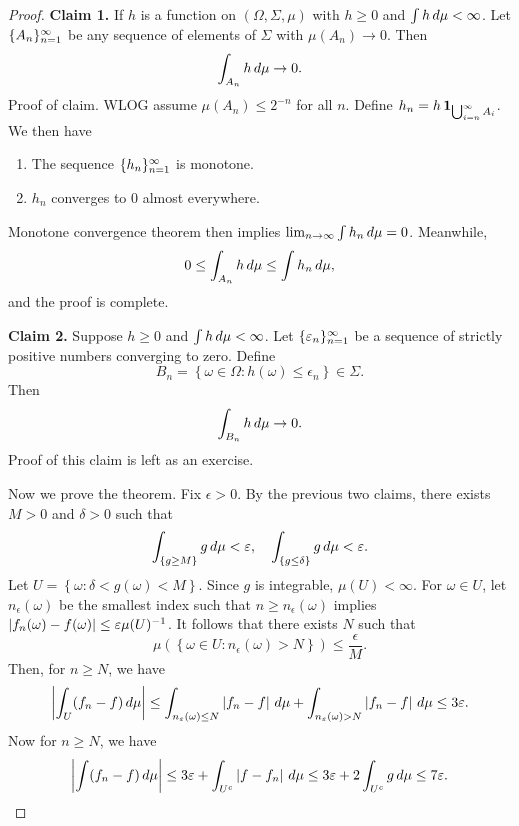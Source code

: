 \documentclass[a4paper]{article}
\begin{document}
\begin{proof}
  \textbf{Claim 1.}
  If $h$ is a function on $(\Omega, \Sigma, \mu)$ with
  $h \geq 0$ and $\int h \, d \mu < \infty$. Let $\{ A_n \}_{n=1}^\infty$
  be any sequence of elements of $\Sigma$ with $\mu (A_n) \to 0$.
  Then
  \[
  \int_{A_n} h \, d \mu \to 0.
  \]
  Proof of claim. WLOG assume $\mu(A_n) \leq 2^{-n}$ for all $n$.
  Define $h_n = h \operatorname{\mathbf{1}}_{\bigcup_{i=n}^\infty A_i}$. We then have
  \begin{enumerate}
    \item The sequence $\{ h_n \}_{n=1}^\infty$ is monotone.
    \item $h_n$ converges to $0$ almost everywhere.
  \end{enumerate}
  Monotone convergence theorem then implies $\lim_{n \to \infty}
  \int h_n \, d \mu = 0$. Meanwhile,
  \[
  0 \leq \int_{A_n} h \, d \mu \leq \int h_n \, d \mu,
  \]
  and the proof is complete.

  \textbf{Claim 2.}
  Suppose $h \geq 0$ and $\int h \, d \mu < \infty$.
  Let $\{ \varepsilon_n \}_{n=1}^\infty$ be a sequence of strictly positive numbers
  converging to zero. Define
  \[
  B_n = \left\{ \omega \in \Omega : h (\omega) \leq \epsilon_n \right\}
  \in \Sigma.
  \]
  Then
  \[
  \int_{B_n} h \, d \mu \to 0.
  \]
  Proof of this claim is left as an exercise.

  Now we prove the theorem. Fix $\epsilon > 0$. By the previous two
  claims, there exists $M > 0$ and $\delta > 0$ such that
  \[
  \int_{\left\{ g \geq M \right\}} g \, d \mu < \varepsilon,
  \quad
  \int_{\left\{ g \leq \delta \right\}} g \, d \mu < \varepsilon.
  \]
  Let $U = \left\{ \omega : \delta < g(\omega) < M \right\}$.
  Since $g$ is integrable, $\mu (U) < \infty$.
  For $\omega \in U$, let $n_\epsilon (\omega)$ be the smallest
  index such that $n \geq n_\epsilon (\omega)$ implies
  $\left\lvert f_n (\omega) - f(\omega)\right\rvert \leq \varepsilon \mu(U)^{-1}$.
  It follows that there exists $N$ such that
  \[
  \mu \left( \left\{ \omega \in U: n_\epsilon (\omega) > N \right\}  \right)
  \leq \frac{\epsilon}{M}.
  \]
  Then, for $n \geq N$, we have
  \begin{align*}
    \left\lvert \int_U (f_n - f) \, d \mu\right\rvert
    \leq \int_{n_\varepsilon (\omega) \leq N} \left\lvert f_n - f\right\rvert \, d \mu
    + \int_{n_\varepsilon (\omega) > N} \left\lvert f_n - f\right\rvert \, d \mu
    \leq 3 \varepsilon.
  \end{align*}
  Now for $n \geq N$, we have
  \[
  \left\lvert \int (f_n - f) \, d \mu\right\rvert
  \leq 3 \varepsilon + \int_{U^c} \left\lvert f - f_n\right\rvert \, d \mu
  \leq 3 \varepsilon + 2 \int_{U^c} g \, d \mu \leq 7 \varepsilon.
  \]

\end{proof}
\end{document}
